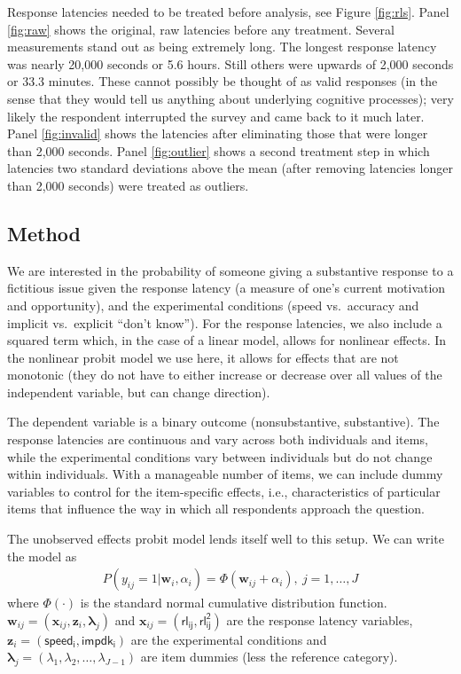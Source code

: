 \documentclass[Royal,times,sageh]{sagej}
\begin{document}
Response latencies needed to be treated before analysis, see Figure
\ref{fig:rls}. Panel \ref{fig:raw} shows the original, raw latencies
before any treatment. Several measurements stand out as being extremely
long. The longest response latency was nearly 20,000 seconds or 5.6
hours. Still others were upwards of 2,000 seconds or 33.3 minutes. These
cannot possibly be thought of as valid responses (in the sense that they
would tell us anything about underlying cognitive processes); very
likely the respondent interrupted the survey and came back to it much
later. Panel \ref{fig:invalid} shows the latencies after eliminating
those that were longer than 2,000 seconds. Panel \ref{fig:outlier} shows
a second treatment step in which latencies two standard deviations above
the mean (after removing latencies longer than 2,000 seconds) were
treated as outliers.

\hypertarget{method}{%
\subsection{Method}\label{method}}

We are interested in the probability of someone giving a substantive
response to a fictitious issue given the response latency (a measure of
one's current motivation and opportunity), and the experimental
conditions (speed vs.~accuracy and implicit vs.~explicit ``don't
know''). For the response latencies, we also include a squared term
which, in the case of a linear model, allows for nonlinear effects. In
the nonlinear probit model we use here, it allows for effects that are
not monotonic (they do not have to either increase or decrease over all
values of the independent variable, but can change direction).

The dependent variable is a binary outcome (nonsubstantive,
substantive). The response latencies are continuous and vary across both
individuals and items, while the experimental conditions vary between
individuals but do not change within individuals. With a manageable
number of items, we can include dummy variables to control for the
item-specific effects, i.e., characteristics of particular items that
influence the way in which all respondents approach the question.

The unobserved effects probit model \citep{Wooldridge2002} lends itself
well to this setup. We can write the model as\\
\begin{align}
P(y_{ij} = 1| \bm{w}_{i}, \alpha_{i}) = \Phi(\bm{w}_{ij} + \alpha_{i}), \ j = 1, \ldots, J \label{eq:probit}
\end{align} where \(\Phi(\cdot)\) is the standard normal cumulative
distribution function.
\(\bm{w}_{ij} = (\bm{x}_{ij}, \bm{z}_{i}, \bm{\lambda}_{j})\) and
\(\bm{x}_{ij} = (\mathsf{rl_{ij}}, \mathsf{rl^{2}_{ij}})\) are the
response latency variables,
\(\bm{z}_{i} = (\mathsf{speed_{i}}, \mathsf{impdk_{i}})\) are the
experimental conditions and
\(\bm{\lambda}_{j} = (\lambda_{1}, \lambda_{2}, \ldots, \lambda_{J-1})\)
are item dummies (less the reference category).
\end{document}
